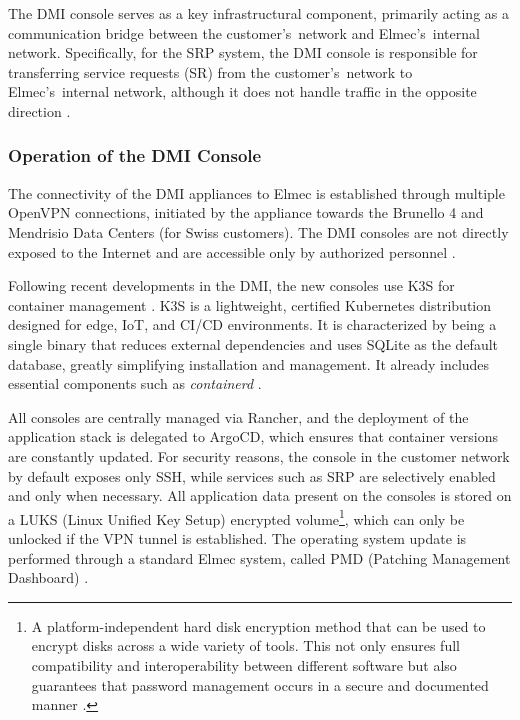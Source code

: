 The DMI console serves as a key infrastructural component, primarily acting as a communication bridge between the customer's~network and Elmec's~internal network. Specifically, for the SRP system, the DMI console is responsible for transferring service requests (SR) from the customer's~network to Elmec's~internal network, although it does not handle traffic in the opposite direction \cite{dmi_infrastructure_git}.

\subsubsection{Operation of the DMI Console}
The connectivity of the DMI appliances to Elmec is established through multiple OpenVPN connections, initiated by the appliance towards the Brunello 4 and Mendrisio Data Centers (for Swiss customers). The DMI consoles are not directly exposed to the Internet and are accessible only by authorized personnel \cite{dmi_infrastructure_git}.

Following recent developments in the DMI, the new consoles use K3S for container management \cite{borg-omega-kubernetes}. K3S is a lightweight, certified Kubernetes distribution designed for edge, IoT, and CI/CD environments. It is characterized by being a single binary that reduces external dependencies and uses SQLite as the default database, greatly simplifying installation and management. It already includes essential components such as \textit{containerd} \cite{borg-omega-kubernetes}.

All consoles are centrally managed via Rancher, and the deployment of the application stack is delegated to ArgoCD, which ensures that container versions are constantly updated. For security reasons, the console in the customer network by default exposes only SSH, while services such as SRP are selectively enabled and only when necessary. All application data present on the consoles is stored on a LUKS (Linux Unified Key Setup) encrypted volume\footnote{A platform-independent hard disk encryption method that can be used to encrypt disks across a wide variety of tools. This not only ensures full compatibility and interoperability between different software but also guarantees that password management occurs in a secure and documented manner \cite{Fruhwirth2005NewMI}.}, which can only be unlocked if the VPN tunnel is established. The operating system update is performed through a standard Elmec system, called PMD (Patching Management Dashboard) \cite{dmi_infrastructure_git}.